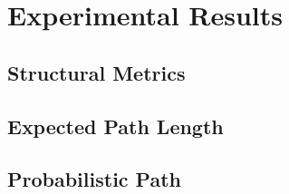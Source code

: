 \section{Experimental Results}\label{subsec:results:main}


\subsection{Structural Metrics}\label{subsec:results:sp}




\subsection{Expected Path Length}\label{subsec:results:epl}


\subsection{Probabilistic Path}\label{subsec:results:pp}


 



